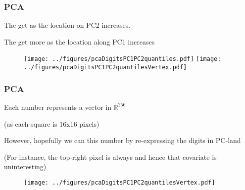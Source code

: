 \documentclass[12pt]{beamer}
\begin{document}
\begin{frame}[fragile]
\frametitle{PCA}
The  get  as the location on PC2 increases.  

\vsp
The  get more  as
the location along PC1 increases 
\begin{figure}
\centering
\texttt{[image: ../figures/pcaDigitsPC1PC2quantiles.pdf]}
\texttt{[image: ../figures/pcaDigitsPC1PC2quantilesVertex.pdf]}
\end{figure}
\end{frame}

\begin{frame}[fragile]
\frametitle{PCA}
Each number represents a vector in $\mathbb{R}^{256}$ 

{\scriptsize (as each square is 16x16 pixels)}  
\vsp

However, hopefully we can  this number by re-expressing the digits in PC-land

\vsp

{\scriptsize (For instance, the top-right pixel is always  and hence that covariate is uninteresting)}
\begin{figure}
\centering
\texttt{[image: ../figures/pcaDigitsPC1PC2quantilesVertex.pdf]}
\end{figure}
\end{frame}
\end{document}
